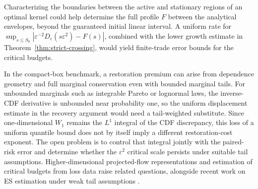 Characterizing the boundaries between the active and stationary regions of an optimal kernel could help determine the full profile \(F\) between the analytical envelopes, beyond the guaranteed initial linear interval. A uniform rate for \(\sup_{s\le S_0}|\varepsilon^{-2}D_\varepsilon(s\varepsilon^2)-F(s)|\), combined with the lower growth estimate in Theorem~\ref{thm:strict-crossing}, would yield finite-trade error bounds for the critical budgets.

In the compact-box benchmark, a restoration premium can arise from dependence geometry and full marginal conservation even with bounded marginal tails. For unbounded marginals such as integrable Pareto or lognormal laws, the inverse-CDF derivative is unbounded near probability one, so the uniform displacement estimate in the recovery argument would need a tail-weighted substitute. Since one-dimensional \(W_1\) remains the \(L^1\) integral of the CDF discrepancy, this loss of a uniform quantile bound does not by itself imply a different restoration-cost exponent. The open problem is to control that integral jointly with the paired-risk error and determine whether the \(\varepsilon^2\) critical scale persists under suitable tail assumptions. Higher-dimensional projected-flow representations and estimation of critical budgets from loss data raise related questions, alongside recent work on ES estimation under weak tail assumptions \cite{bartleckstein2026}.
